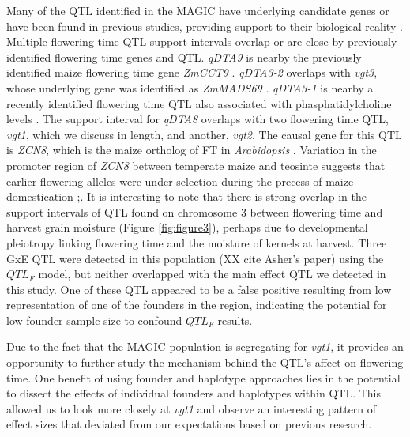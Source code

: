 \documentclass[article,9pt,twocolumn,twoside]{rilabRxiv}
\begin{document}
Many of the QTL identified in the MAGIC have underlying candidate genes or have been found in previous studies, providing support to their biological reality .
Multiple flowering time QTL support intervals overlap or are close by previously identified flowering time genes and QTL.
\emph{qDTA9} is nearby the previously identified maize flowering time gene \emph{ZmCCT9} \cite{Huang3}.
\emph{qDTA3-2} overlaps with \emph{vgt3}, whose underlying gene was identified as \emph{ZmMADS69} \cite{Liang}.
\emph{qDTA3-1} is nearby a recently identified flowering time QTL also associated with phasphatidylcholine levels \cite{RodriguezZapata}.
The support interval for \emph{qDTA8} overlaps with two flowering time QTL, \emph{vgt1}, which we discuss in length, and another, \emph{vgt2}. The causal gene for this QTL is \emph{ZCN8}, which is the maize ortholog of FT in \emph{Arabidopsis} \cite{Lazakis}.
Variation in the promoter region of \emph{ZCN8} between temperate maize and teosinte suggests that earlier flowering alleles were under selection during the precess of maize domestication \citep{Guo};\citep{Bouchet}.
It is interesting to note that there is strong overlap in the support intervals of QTL found on chromosome 3 between flowering time and harvest grain moisture (Figure \ref{fig:figure3}), perhaps due to developmental pleiotropy linking flowering time and the moisture of kernels at harvest.
Three GxE QTL were detected in this population (XX cite Asher's paper) using the $QTL_F$ model, but neither overlapped with the main effect QTL we detected in this study.
One of these QTL appeared to be a false positive resulting from low representation of one of the founders in the region, indicating the potential for low founder sample size to confound $QTL_F$ results.

Due to the fact that the MAGIC population is segregating for \emph{vgt1}, it provides an opportunity to further study the mechanism behind the QTL's affect on flowering time.
One benefit of using founder and haplotype approaches lies in the potential to dissect the effects of individual founders and haplotypes within QTL.
This allowed us to look more closely at \emph{vgt1} and observe an interesting pattern of effect sizes that deviated from our expectations based on previous research.


\end{document}
